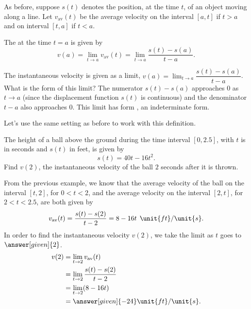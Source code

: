 \documentclass{ximera}
\begin{document}
 \begin{definition}
 	As before, suppose $s(t)$ denotes the position, at the time $t$, of an object moving along a line.
 	Let $v_{\text{av}}(t)$ be the average velocity on the interval $[a, t]$ if $t>a$ and on interval $[t, a]$ if $t<a$.
 	
 	The  at the time $t=a$ is given by
	\[ v(a) = \lim_{t\to a} v_{\text{av}}(t) = \lim_{t\to a}\dfrac{s(t)-s(a)}{t-a}.\]

 \end{definition} 
The instantaneous velocity is given as a limit, $v(a) = \lim_{t\to a}\dfrac{s(t)-s(a)}{t-a}$. What is the form of this limit?
The numerator $s(t)-s(a)$ approaches $0$ as $t\to a$ (since the displacement function $s(t)$ is continuous) and the denominator $t-a$
also approaches $0$. This limit has form \zeroOverZero, an indeterminate form.
   
Let's use the same setting as before to work with this definition.
\begin{example}
	The height of a ball above the ground during the time interval  $[0,2.5]$, with $t$ is in seconds and $s(t)$ in feet, 
	is given by
	\[ s(t) = 40t - 16t^2.\] 
	Find $v(2)$, the instantaneous velocity of the ball $2$ seconds after it is thrown.
	
	\begin{explanation}
		From the previous example, we know that the average velocity of the
		ball on the interval $[t,2]$, for $0<t<2$, and the average velocity
		on the interval $[2,t]$, for $2<t<2.5$, are both given by
		\[
		v_{\text{av}}(t) =  \frac{s(t)-s(2)}{t-2}= 8-16t \hspace{0.06in}\unit{ft}/\unit{s}.
		\]
		In order to find the instantaneous velocity $v(2)$, we 
		take the limit as $t$ goes to $\answer[given]{2}$. 
		\begin{align*}
			v (2) &= \lim_{t\to2}v_{\text{av}}(t)\\
				&=\lim_{t\to2}  \frac{s(t)-s(2)}{t-2} \\
				&= \lim_{t\to2}(8-16t)\\
				&= \answer[given]{-24}\unit{ft}/\unit{s}.
		\end{align*}
	\end{explanation}
\end{example}
\end{document}
